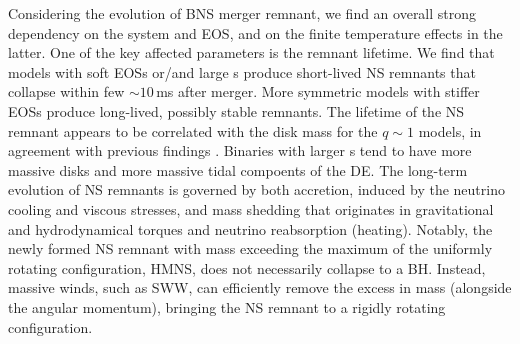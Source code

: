 Considering the \pmerg{} evolution of \ac{BNS} merger remnant, we find an
overall strong dependency on the system \mr{} and \ac{EOS}, and on the 
finite temperature effects in the latter. One of the key affected 
parameters is the remnant lifetime. We find that models with 
soft \acp{EOS} or/and large \mr{}s produce short-lived \ac{NS} remnants that 
collapse within few ${\sim}10\,$ms after merger. 
%
More symmetric models with stiffer \acp{EOS} produce long-lived, possibly 
stable remnants. The lifetime of the \ac{NS} remnant appears to be correlated with the 
disk mass for the $q\sim 1$ models, in agreement with previous findings 
\citep{Radice:2017lry,Radice:2018pdn}.
Binaries with larger \mr{}s tend to have more massive disks and more massive tidal 
compoents of the \ac{DE}.
%
%
The long-term evolution of \pmerg{} \ac{NS} remnants is governed by both accretion, 
induced by the neutrino cooling and viscous stresses, and mass shedding that originates 
in gravitational and hydrodynamical torques and neutrino reabsorption (heating). 
Notably, the newly formed \ac{NS} remnant with mass exceeding the 
maximum of the uniformly rotating configuration, \ac{HMNS}, does not necessarily collapse 
to a \ac{BH}. Instead, massive winds, such as \ac{SWW}, can efficiently remove the 
excess in mass (alongside the angular momentum), bringing the \ac{NS} remnant 
to a rigidly rotating configuration.
%

